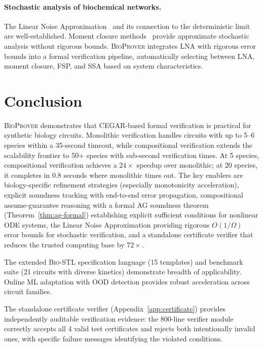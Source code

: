 \documentclass[11pt]{article}
\newcommand{\bioprover}{\textsc{BioProver}}
\newcommand{\cegar}{\textsc{CEGAR}}
\newcommand{\biostl}{\textsc{Bio-STL}}
\begin{document}
\paragraph{Stochastic analysis of biochemical networks.}
The Linear Noise Approximation~\cite{vankampen2007stochastic} and
its connection to the deterministic limit~\cite{kurtz1972relationship}
are well-established. Moment closure
methods~\cite{gillespie1977exact} provide approximate stochastic
analysis without rigorous bounds. \bioprover{} integrates LNA with
rigorous error bounds into a formal verification pipeline,
automatically selecting between LNA, moment closure, FSP, and SSA
based on system characteristics.

\section{Conclusion}
\label{sec:conclusion}

\bioprover{} demonstrates that \cegar{}-based formal verification is
practical for synthetic biology circuits. Monolithic verification
handles circuits with up to 5--6 species within a 35-second timeout,
while compositional verification extends the scalability frontier to
50+ species with sub-second verification times. At 5 species,
compositional verification achieves a $24\times$ speedup over
monolithic; at 20 species, it completes in 0.8 seconds where
monolithic times out. The key enablers are biology-specific
refinement strategies (especially monotonicity acceleration),
explicit soundness tracking with end-to-end error propagation,
compositional assume-guarantee reasoning with a formal AG soundness
theorem (Theorem~\ref{thm:ag-formal}) establishing explicit
sufficient conditions for nonlinear ODE systems, the Linear Noise
Approximation providing rigorous $O(1/\Omega)$ error bounds for
stochastic verification, and a standalone certificate verifier that
reduces the trusted computing base by $72\times$.

The extended \biostl{} specification language (15 templates) and
benchmark suite (21 circuits with diverse kinetics) demonstrate
breadth of applicability. Online ML adaptation with OOD detection
provides robust acceleration across circuit families.

The standalone certificate verifier (Appendix~\ref{app:certificate})
provides independently auditable verification evidence: the 800-line
verifier module correctly accepts all 4 valid test certificates and
rejects both intentionally invalid ones, with specific failure
messages identifying the violated conditions.
\end{document}

